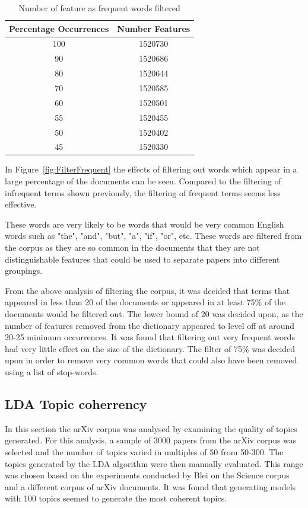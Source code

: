 \begin{table}[h]
    \centering
    \begin{tabular}{|c c|}
         \hline
         Percentage Occurrences & Number Features \\ [0.5ex]
         \hline\hline
         100 & 1520730 \\
         90 & 1520686 \\
         80 & 1520644 \\
         70 & 1520585 \\
         60 & 1520501 \\
         55 & 1520455 \\
         50 & 1520402 \\
         45 & 1520330 \\ [1ex]
         \hline
    \end{tabular}
    \caption{Number of feature as frequent words filtered}
    \label{table:frequentFeatures}
\end{table}

In Figure~\ref{fig:FilterFrequent} the effects of filtering out words which appear in a large percentage of the documents can be seen.
Compared to the filtering of infrequent terms shown previously, the filtering of frequent terms seems less effective.

These words are very likely to be words that would be very common English words such as "the", "and", "but", "a", "if", "or", etc.
These words are filtered from the corpus as they are so common in the documents that they are not distinguishable features that could be used to separate papers into different groupings.

From the above analysis of filtering the corpus, it was decided that terms that appeared in less than 20 of the documents or appeared in at least 75\% of the documents would be filtered out.
The lower bound of 20 was decided upon, as the number of features removed from the dictionary appeared to level off at around 20-25 minimum occurrences.
It was found that filtering out very frequent words had very little effect on the size of the dictionary.
The filter of 75\% was decided upon in order to remove very common words that could also have been removed using a list of stop-words.

\subsection{LDA Topic coherrency}
In this section the arXiv corpus was analysed by examining the quality of topics generated.
For this analysis, a sample of 3000 papers from the arXiv corpus was selected and the number of topics varied in multiples of 50 from 50-300.
The topics generated by the LDA algorithm were then manually evaluated.
This range was chosen based on the experiments conducted by Blei on the Science corpus and a different corpus of arXiv documents\cite{BleiArXiv}.
It was found that generating models with 100 topics seemed to generate the most coherent topics.

